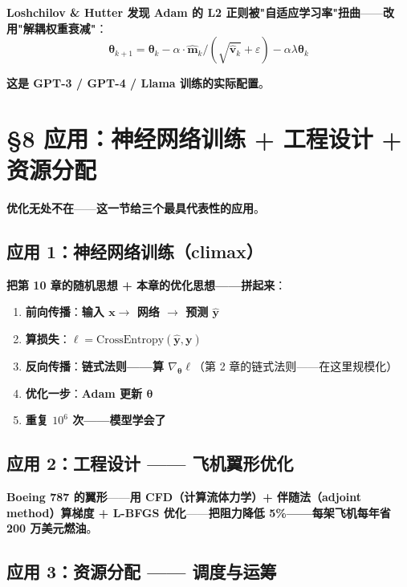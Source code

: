 \textbf{Loshchilov \& Hutter 发现 Adam 的 L2 正则被"自适应学习率"扭曲}——\textbf{改用"\textbf{解耦权重衰减}"}：
\begin{equation}
\bm \theta_{k+1} = \bm \theta_k - \alpha \cdot \hat{\bm m}_k / (\sqrt{\hat{\bm v}_k} + \varepsilon) - \alpha \lambda \bm \theta_k
\end{equation}

\textbf{这是 GPT-3 / GPT-4 / Llama 训练的实际配置}。

\section{§8 应用：神经网络训练 + 工程设计 + 资源分配}

\textbf{优化无处不在}——\textbf{这一节给三个最具代表性的应用}。

\subsection{应用 1：神经网络训练（climax）}

\textbf{把第 10 章的随机思想 + 本章的优化思想——拼起来}：

\begin{enumerate}
\item \textbf{前向传播}：\textbf{输入 $\bm x \to$ 网络 $\to$ 预测 $\hat{\bm y}$}
\item \textbf{算损失}：$\ell = \text{CrossEntropy}(\hat{\bm y}, \bm y)$
\item \textbf{反向传播}：\textbf{链式法则——算 $\nabla_{\bm \theta} \ell$}（第 2 章的链式法则——在这里规模化）
\item \textbf{优化一步}：\textbf{Adam 更新 $\bm \theta$}
\item \textbf{重复 $10^6$ 次——\textbf{模型学会了}}
\end{enumerate}

\subsection{应用 2：工程设计 —— 飞机翼形优化}

\textbf{Boeing 787 的翼形}——\textbf{用 CFD（计算流体力学）+ 伴随法（adjoint method）算梯度 + L-BFGS 优化}——\textbf{把阻力降低 5\%——每架飞机每年省 200 万美元燃油}。

\subsection{应用 3：资源分配 —— 调度与运筹}

